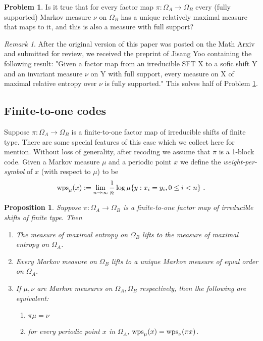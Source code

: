 \documentclass{kepart2010}
\theoremstyle{plain}
\newtheorem{prop}[thm]{Proposition}
\theoremstyle{definition}
\newtheorem{prob}[thm]{Problem}
\theoremstyle{remark}
\newtheorem{rem}[thm]{Remark}        \newtheorem{ex}[thm]{Example}
\theoremstyle{definition}
\numberwithin{equation}{section}
\begin{document}
\begin{prob}\label{prob_liftmarkovs}
Is it true that for every factor map $\pi : \Omega_A \to \Omega_B$
every (fully supported) Markov measure $\nu$ on $\Omega_B$ has a
unique relatively maximal measure that maps to it, and this is also
a measure with full support?
\end{prob}

\begin{rem} After the original version of this paper was posted on the
Math Arxiv and submitted for review, we received the preprint
\cite{Yoo2009} of Jisang Yoo containing the following result: "Given
a factor map from an irreducible SFT X to a sofic shift Y and an
invariant measure $\nu$ on Y with full support, every measure on X
of maximal relative entropy over $\nu$ is fully supported." This
solves half of Problem \ref{prob_liftmarkovs}.
\end{rem}

\subsection{Finite-to-one codes}\label{sec_finitetoone}

Suppose $\pi : \Omega_A \to \Omega_B$ is a finite-to-one factor map
of irreducible shifts of finite type. There are some special
features of this case which we collect here for mention. Without
loss of generality, after recoding we assume that $\pi$ is a 1-block
code. Given a Markov measure $\mu$ and a periodic point $x$ we
define the {\it weight-per-symbol} of $x$ (with respect to $\mu$) to
be \begin{equation} \label{wps} \textnormal{wps}_{\mu}(x) :=\lim_{n \to
\infty}\frac 1n \log \mu \{y: x_i = y_i, 0 \leq i < n\} \ . \end{equation}

\begin{prop} \label{prop_finitetoone}
Suppose
 $\pi : \Omega_A \to \Omega_B$ is a finite-to-one
factor map of irreducible shifts of finite type. Then

\begin{enumerate}
\item
The measure of maximal entropy on $\Omega_B$
lifts to the measure of maximal entropy on $\Omega_A$.
\item
Every Markov measure on $\Omega_B$ lifts to a {unique}
 Markov measure of equal order on
$\Omega_A$.
\item  \label{percond}
If $\mu, \nu$  are Markov measures
 on $\Omega_A,\Omega_B$ respectively, then
 the following are equivalent:
\begin{enumerate}
\item
  $\pi \mu = \nu$
\item
for every periodic point $x$ in $\Omega_A$,
$\textnormal{wps}_{\mu}(x) =
\textnormal{wps}_{\nu}(\pi x) $.
\end{enumerate}
\end{enumerate}
\end{prop}
\end{document}
